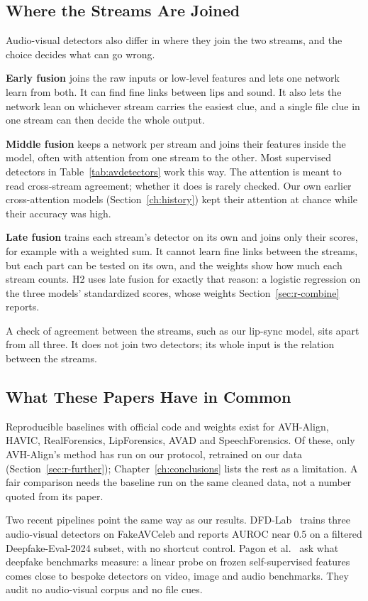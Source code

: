 \subsection{Where the Streams Are Joined}

Audio-visual detectors also differ in where they join the two streams, and
the choice decides what can go wrong.

\textbf{Early fusion} joins the raw inputs or low-level features and lets one
network learn from both. It can find fine links between lips and sound. It
also lets the network lean on whichever stream carries the easiest clue, and
a single file clue in one stream can then decide the whole output.

\textbf{Middle fusion} keeps a network per stream and joins their features
inside the model, often with attention from one stream to the other. Most
supervised detectors in Table~\ref{tab:avdetectors} work this way. The
attention is meant to read cross-stream agreement; whether it does is
rarely checked. Our own earlier cross-attention models
(Section~\ref{ch:history}) kept their attention at chance while their
accuracy was high.

\textbf{Late fusion} trains each stream's detector on its own and joins only
their scores, for example with a weighted sum. It cannot learn fine links
between the streams, but each part can be tested on its own, and the weights
show how much each stream counts. H2 uses late fusion for exactly that
reason: a logistic regression on the three models' standardized scores, whose
weights Section~\ref{sec:r-combine} reports.

A check of agreement between the streams, such as our lip-sync model, sits
apart from all three. It does not join two detectors; its whole input is the
relation between the streams.

\subsection{What These Papers Have in Common}

Reproducible baselines with official code and weights exist for AVH-Align,
HAVIC, RealForensics, LipForensics, AVAD and SpeechForensics. Of these, only
AVH-Align's method has run on our protocol, retrained on our data
(Section~\ref{sec:r-further}); Chapter~\ref{ch:conclusions} lists the rest as
a limitation. A fair comparison needs the baseline run on the same cleaned
data, not a number quoted from its paper.

Two recent pipelines point the same way as our results. DFD-Lab~\cite{dfdlab2026}
trains three audio-visual detectors on FakeAVCeleb and reports AUROC near 0.5
on a filtered Deepfake-Eval-2024 subset, with no shortcut control. Pagon et
al.~\cite{pagon2026} ask what deepfake benchmarks measure: a linear probe on
frozen self-supervised features comes close to bespoke detectors on video,
image and audio benchmarks. They audit no audio-visual corpus and no file
cues.

